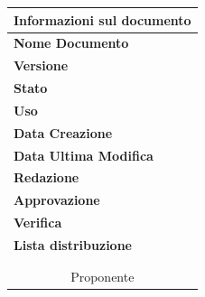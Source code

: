 \begin{titlepage}
\begin{center}
		\begin{table}[h]
			\begin{center}
			\begin{tabular}{l  l}
				\multicolumn{2}{c}{\textbf{Informazioni sul documento}}\\
				\midrule
				\textbf{Nome Documento}	&	\titoloDoc	\\
				\textbf{Versione}	&	\versione	\\
				\textbf{Stato}	&	\emph{\stato}	\\
				\textbf{Uso}	&	\emph{\uso}	\\
				\textbf{Data Creazione}	&	\dataCreazione	\\
				\textbf{Data Ultima Modifica}	&	\dataUM	\\
				\textbf{Redazione}	&	\redaz \\
				\textbf{Approvazione}	&	\appr \\
				\textbf{Verifica}	&	\verif \\
				\textbf{Lista distribuzione}	&	\emph{\gruppo} 	\\
				\multicolumn{2}{c}{\Vardanega}	\\
				\multicolumn{2}{c}{\Cardin}	\\
				\multicolumn{2}{c}{Proponente \Zucchetti}	\\
			\end{tabular}
			\end{center}
		\end{table}
	\end{center}
\end{titlepage}